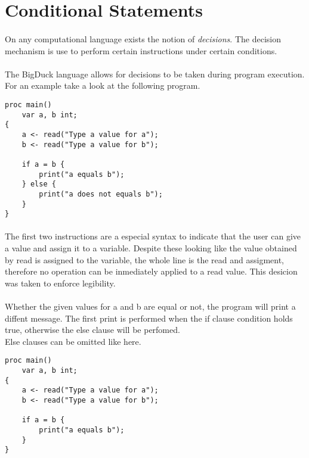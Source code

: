\section{Conditional Statements}

\paragraph{} On any computational language exists the notion of
\emph{decisions}. The decision mechanism is use to perform certain instructions
under certain conditions.

\paragraph{} The BigDuck language allows for decisions to be taken during
program execution. For an example take a look at the following program.

\begin{verbatim}
proc main()
    var a, b int;
{
    a <- read("Type a value for a");
    b <- read("Type a value for b");

    if a = b {
        print("a equals b");
    } else {
        print("a does not equals b");
    }
}
\end{verbatim}

\paragraph{} The first two instructions are a especial syntax to indicate that
the user can give a value and assign it to a variable. Despite these looking
like the value obtained by read is assigned to the variable, the whole line
is the read and assigment, therefore no operation can be inmediately applied to
a read value. This desicion was taken to enforce legibility.

\paragraph{} Whether the given values for a and b are equal or not, the program
will print a diffent message. The first print is performed when the if clause
condition holds true, otherwise the else clause will be perfomed.\\

\noindent
Else clauses can be omitted like here.

\begin{verbatim}
proc main()
    var a, b int;
{
    a <- read("Type a value for a");
    b <- read("Type a value for b");

    if a = b {
        print("a equals b");
    }
}
\end{verbatim}

